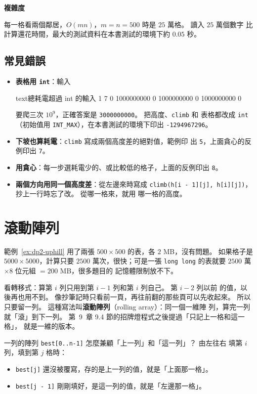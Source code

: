 \textbf{複雜度}

每一格看兩個鄰居，$O(mn)$，$m = n = 500$ 時是 $25$ 萬格。 讀入 $25$ 萬個數字
比計算還花時間，最大的測試資料在本書測試的環境下約 $0.05$ 秒。

\subsection{常見錯誤}
\label{sec:dp2-uphill-err}

\begin{itemize}
\item \textbf{表格用 \texttt{int}}：輸入
\begin{code}{text}{總耗電超過 int 的輸入}
1 7
0 1000000000 0 1000000000 0 1000000000 0
\end{code}
要爬三次 $10^9$，正確答案是 \texttt{3000000000}。 把高度、\texttt{climb} 和
表格都改成 \texttt{int}（初始值用 \texttt{INT\_MAX}），在本書測試的環境下印出
\texttt{-1294967296}。
\item \textbf{下坡也算耗電}：\texttt{climb} 寫成兩個高度差的絕對值，範例印
出 \texttt{5}，上面貪心的反例印出 \texttt{7}。
\item \textbf{用貪心}：每一步選耗電少的、或比較低的格子，上面的反例印出
\texttt{8}。
\item \textbf{兩個方向用同一個高度差}：從左邊來時寫成
\texttt{climb(h[i - 1][j], h[i][j])}，抄上一行時忘了改。 從哪一格來，就用
哪一格的高度。
\end{itemize}

\section{滾動陣列}
\label{sec:dp2-rolling}

範例~\ref{ex:dp2-uphill} 用了兩張 $500 \times 500$ 的表，各 $2$ MB，沒有問題。
如果格子是 $5000 \times 5000$，計算只要 $2500$ 萬次，很快；可是一張
\texttt{long long} 的表就要 $2500$ 萬 $\times 8$ 位元組 $= 200$ MB，很多題目的
記憶體限制放不下。

看轉移式：算第 $i$ 列只用到第 $i - 1$ 列和第 $i$ 列自己。 第 $i - 2$ 列以前
的值，以後再也用不到。 像抄筆記時只看前一頁，再往前翻的那些頁可以先收起來。
所以只要留一列。 這種寫法叫\textbf{滾動陣列}（rolling array）：同一個一維陣
列，算完一列就「滾」到下一列。 第~9~章 9.4 節的招牌燈程式之後提過「只記上一格和這一格」，
就是一維的版本。

一列的陣列 \texttt{best[0..n-1]} 怎麼兼顧「上一列」和「這一列」？ 由左往右
填第 $i$ 列，填到第 $j$ 格時：

\begin{itemize}
\item \texttt{best[j]} 還沒被覆寫，存的是上一列的值，就是「上面那一格」。
\item \texttt{best[j - 1]} 剛剛填好，是這一列的值，就是「左邊那一格」。
\end{itemize}

